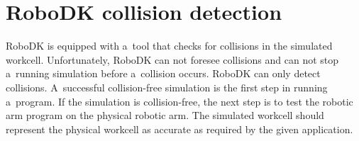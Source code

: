 \section{RoboDK collision detection}

RoboDK is equipped with a~tool that checks for collisions in the simulated workcell. Unfortunately, RoboDK can not foresee collisions and can not stop a~running simulation before a~collision occurs. RoboDK can only detect collisions. A~successful collision-free simulation  is the first step in running a~program. If the simulation is collision-free, the next step is to test the robotic arm program on the physical robotic arm. The simulated workcell should represent the physical workcell as accurate as required by the given application. 

